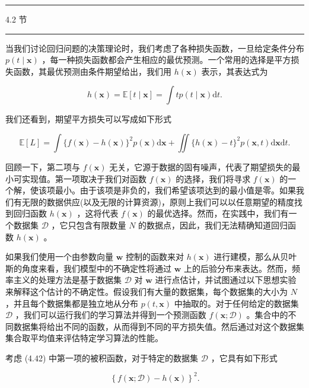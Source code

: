 \documentclass[10pt]{report}
\newcommand{\HRule}{\begin{center}\rule{0.9\linewidth}{0.2mm}\end{center}}
\begin{document}
\HRule

4.2 节

\HRule

当我们讨论回归问题的决策理论时，我们考虑了各种损失函数，一旦给定条件分布 \(p\left( {t \mid  \mathbf{x}}\right)\) ，每一种损失函数都会产生相应的最优预测。一个常用的选择是平方损失函数，其最优预测由条件期望给出，我们用 \(h\left( \mathbf{x}\right)\) 表示，其表达式为

\[
h\left( \mathbf{x}\right)  = \mathbb{E}\left\lbrack  {t \mid  \mathbf{x}}\right\rbrack   = \int {tp}\left( {t \mid  \mathbf{x}}\right) \mathrm{d}t. \tag{4.41}
\]

我们还看到，期望平方损失可以写成如下形式

\[
\mathbb{E}\left\lbrack  L\right\rbrack   = \int \{ f\left( \mathbf{x}\right)  - h\left( \mathbf{x}\right) {\} }^{2}p\left( \mathbf{x}\right) \mathrm{d}\mathbf{x} + \iint \{ h\left( \mathbf{x}\right)  - t{\} }^{2}p\left( {\mathbf{x},t}\right) \mathrm{d}\mathbf{x}\mathrm{d}t. \tag{4.42}
\]

回顾一下，第二项与 \(f\left( \mathbf{x}\right)\) 无关，它源于数据的固有噪声，代表了期望损失的最小可实现值。第一项取决于我们对函数 \(f\left( \mathbf{x}\right)\) 的选择，我们将寻求 \(f\left( \mathbf{x}\right)\) 的一个解，使该项最小。由于该项是非负的，我们希望该项达到的最小值是零。如果我们有无限的数据供应(以及无限的计算资源)，原则上我们可以以任意期望的精度找到回归函数 \(h\left( \mathbf{x}\right)\) ，这将代表 \(f\left( \mathbf{x}\right)\) 的最优选择。然而，在实践中，我们有一个数据集 \(\mathcal{D}\) ，它只包含有限数量 \(N\) 的数据点，因此，我们无法精确知道回归函数 \(h\left( \mathbf{x}\right)\) 。

如果我们使用一个由参数向量 \(\mathbf{w}\) 控制的函数来对 \(h\left( \mathbf{x}\right)\) 进行建模，那么从贝叶斯的角度来看，我们模型中的不确定性将通过 \(\mathbf{w}\) 上的后验分布来表达。然而，频率主义的处理方法是基于数据集 \(\mathcal{D}\) 对 \(\mathbf{w}\) 进行点估计，并试图通过以下思想实验来解释这个估计的不确定性。假设我们有大量的数据集，每个数据集的大小为 \(N\) ，并且每个数据集都是独立地从分布 \(p\left( {t,\mathbf{x}}\right)\) 中抽取的。对于任何给定的数据集 \(\mathcal{D}\) ，我们可以运行我们的学习算法并得到一个预测函数 \(f\left( {\mathbf{x};\mathcal{D}}\right)\) 。集合中的不同数据集将给出不同的函数，从而得到不同的平方损失值。然后通过对这个数据集集合取平均值来评估特定学习算法的性能。

考虑 (4.42) 中第一项的被积函数，对于特定的数据集 \(\mathcal{D}\) ，它具有如下形式

\[
{\left\{  f\left( \mathbf{x};\mathcal{D}\right)  - h\left( \mathbf{x}\right) \right\}  }^{2}. \tag{4.43}
\]
\end{document}
